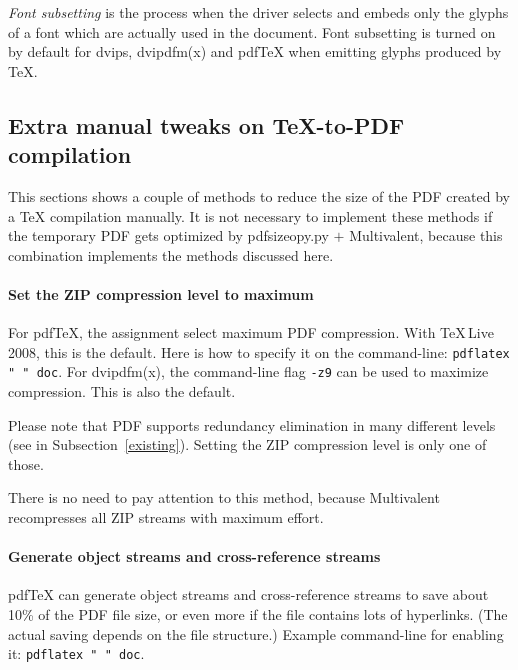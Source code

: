 \documentclass{ltugproc}
\def\cmd{\textsf}
\begin{document}
\emph{Font subsetting} is the process when the driver selects and embeds
only the glyphs of a font which are actually used in the document. Font
subsetting is turned on by default for \cmd{dvips}, \cmd{dvipdfm(x)} and
pdf\TeX{} when emitting glyphs produced by \TeX{}.


\subsection{Extra manual tweaks on \TeX{}-to-PDF compilation}

This sections shows a couple of methods to reduce the size of the PDF created
by a \TeX{} compilation manually. It is not necessary to implement these
methods if the temporary PDF gets optimized by \cmd{pdfsizeopy.py}
$+$ Multivalent, because this combination implements the methods discussed
here.

\paragraph{Set the ZIP compression level to maximum}

For pdf\TeX{}, the assignment \texttt{\string{}} select
maximum PDF compression. With \TeX{}\,Live 2008, this is the default. Here
is how to specify it on the command-line:
\texttt{pdflatex "\string{} \string" doc}.
For \cmd{dvipdfm(x)}, the command-line flag \texttt{-z9} can be used to
maximize compression. This is also the default.

Please note that PDF supports redundancy elimination in many different
levels (see in Subsection~\ref{existing}). Setting the ZIP compression level is
only one of those.

There is no need to pay attention to this method, because
Multivalent recompresses all ZIP streams with maximum effort.

\paragraph{Generate object streams and cross-reference streams}

pdf\TeX{} can generate object streams and cross-reference streams to save
about 10\% of the PDF file size, or even more if the file contains lots of
hyperlinks. (The actual saving depends on the file
structure.) Example command-line for enabling it:
\texttt{pdflatex "\string{} \string{}
\string" doc}.
\end{document}
